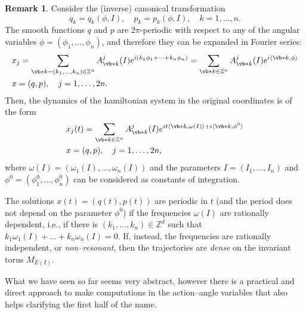 \documentclass[english,fontsize=11pt,paper=b5]{scrbook}
\numberwithin{equation}{chapter}
\theoremstyle{definition}
\newtheorem{remark}{Remark}[chapter]
\begin{document}
      \begin{remark}\label{rmk:nonresonant}
        Consider the (inverse) canonical transformation
        \begin{equation}
          q_k = q_k(\phi, I), \quad p_k = p_k(\phi, I), \quad k=1,\ldots,n.
        \end{equation}
        The smooth functions $q$ and $p$ are $2\pi$-periodic with respect to any of the angular variables $\phi = (\phi_1, \ldots, \phi_n)$, and therefore they can be expanded in Fourier series:
        \begin{align}
     & x_j = \sum_{\vb* k = (k_1, \ldots, k_n)\in\mathbb{Z}^n} A^j_{\vb* k}(I) e^{i(k_1 \phi_1 + \cdots + k_n \phi_n)} = \sum_{\vb* k\in\mathbb{Z}^n} A^j_{\vb* k}(I) e^{i\langle\vb* k, \phi\rangle} \\
     & x = (q,p), \quad j=1,\ldots,2n.
        \end{align}
        Then, the dynamics of the hamiltonian system in the original coordinates is of the form
        \begin{align}
     & x_j(t) = \sum_{\vb* k\in\mathbb{Z}^n} A^j_{\vb* k}(I) e^{i t\langle\vb* k, \omega(I)\rangle + i\langle\vb* k,\phi^0\rangle} \\
     & x = (q,p), \quad j=1,\ldots,2n,
        \end{align}
        where $\omega(I) = (\omega_1(I), \ldots, \omega_n(I))$ and the parameters $I = (I_1, \ldots, I_n)$ and $\phi^0 = (\phi_1^0, \ldots, \phi_n^0)$ can be considered as constants of integration.

        The solutions $x(t) = (q(t), p(t))$ are periodic in $t$ (and the period does not depend on the parameter $\phi^0$) if the frequencies $\omega(I)$ are rationally dependent, i.e., if there is $(k_1, \ldots, k_n)\in\mathbb{Z}^d$ such that $k_1\omega_1(I) + \ldots + k_n \omega_n(I) = 0$.
        If, instead, the frequencies are rationally independent, or \emph{non--resonant}, then the trajectories are \emph{dense} on the invariant torus $M_{E(I)}$.
      \end{remark}

      What we have seen so far seems very abstract, however there is a practical and direct approach to make computations in the action--angle variables that also helps clarifying the first half of the name.
\end{document}

